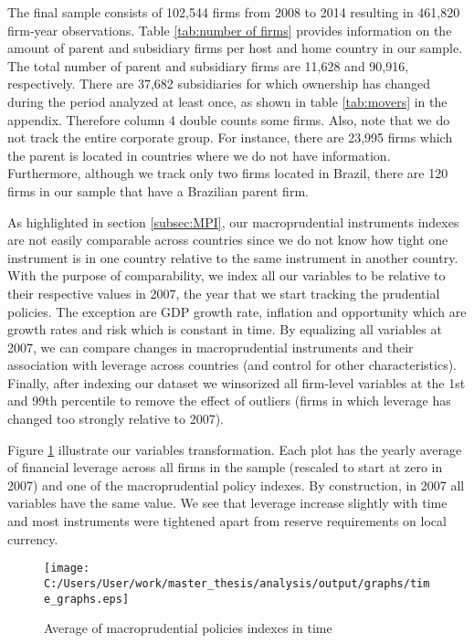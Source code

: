 \documentclass[12pt]{article}
\begin{document}
	The final sample consists of 102,544 firms from 2008 to 2014 resulting in 461,820 firm-year observations. Table \ref{tab:number of firms} provides information on the amount of parent and subsidiary firms per host and home country in our sample. The total number of parent and subsidiary firms are 11,628 and 90,916, respectively. There are 37,682 subsidiaries for which ownership has changed during the period analyzed at least once, as shown in table \ref{tab:movers} in the appendix. Therefore column 4 double counts some firms. Also, note that we do not track the entire corporate group. For instance, there are 23,995 firms which the parent is located in countries where we do not have information. Furthermore, although we track only two firms located in Brazil, there are 120 firms in our sample that have a Brazilian parent firm.  
	
		\begin{small}
		{
			
		}
	\end{small}

	
	As highlighted in section \ref{subsec:MPI}, our macroprudential instruments indexes are not easily comparable across countries since we do not know how tight one instrument is in one country relative to the same instrument in another country. With the purpose of comparability, we index all our variables to be relative to their respective values in 2007, the year that we start tracking the prudential policies. The exception are GDP growth rate, inflation and opportunity which are growth rates and risk which is constant in time. By equalizing all variables at 2007, we can compare changes in macroprudential instruments and their association with leverage across countries (and control for other characteristics). Finally, after indexing our dataset we winsorized all firm-level variables at the 1st and 99th percentile to remove the effect of outliers (firms in which leverage has changed too strongly relative to 2007). 
	
	Figure \ref{fig:time graph} illustrate our variables transformation. Each plot has the yearly average of financial leverage across all firms in the sample (rescaled to start at zero in 2007) and one of the macroprudential policy indexes. By construction, in 2007 all variables have the same value. We see that leverage increase slightly with time and most instruments were tightened apart from reserve requirements on local currency.   
	
		\begin{figure}[h!]
		\centering
		\caption{Average of macroprudential policies indexes in time}
		\texttt{[image: C:/Users/User/work/master\_thesis/analysis/output/graphs/time\_graphs.eps]}
		\label{fig:time graph}
	\end{figure}
	
\end{document}
